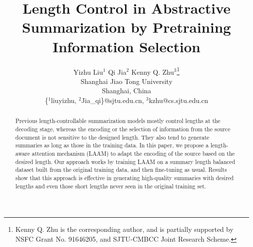 \documentclass[11pt]{article}
\title{Length Control in Abstractive Summarization by Pretraining Information
Selection}
\author{Yizhu Liu$^1$ \hspace*{1cm} Qi Jia$^2$ \hspace*{1cm} Kenny Q. Zhu$^3$\thanks{Kenny Q. Zhu is the corresponding author, and is partially supported by NSFC Grant No.  91646205, and SJTU-CMBCC Joint Research Scheme.}\\
	Shanghai Jiao Tong University \\ Shanghai, China \\
	\{$^1$liuyizhu, $^2$Jia\_qi\}@sjtu.edu.cn,
	$^3$kzhu@cs.sjtu.edu.cn}
\begin{document}
	\maketitle

\begin{abstract} 
Previous length-controllable summarization models mostly 
control lengths at the decoding stage, whereas the encoding or
the selection of information from the source document
is not sensitive to the designed length.
They also tend to generate summaries as long as those in the training data.
In this paper, we propose a length-aware attention mechanism (LAAM) to 
adapt the encoding of the source based on the desired length.
Our approach works by training LAAM on a summary length balanced dataset
built from the original training data, and then fine-tuning as usual.
Results show that this approach is effective in generating
high-quality summaries with desired lengths and 
even those short lengths never seen in the original training set.
\end{abstract}




 









%
\end{document}
